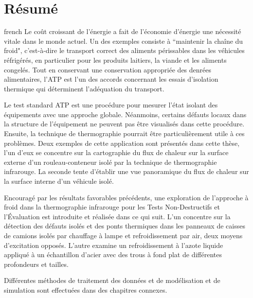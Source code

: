 \chapter*{Résumé}                      %

\begin{otherlanguage*}{french}
  Le coût croissant de l'énergie a fait de l'économie d'énergie une nécessité vitale dans le monde actuel. Un des exemples consiste à ``maintenir la chaîne du froid", c'est-à-dire le transport correct des aliments périssables dans les véhicules réfrigérés, en particulier pour les produits laitiers, la viande et les aliments congelés. Tout en conservant une conservation appropriée des denrées alimentaires, l'ATP est l'un des accords concernant les essais d'isolation thermique qui déterminent l'adéquation du transport.
  
  Le test standard ATP est une procédure pour mesurer l'état isolant des équipements avec une approche globale. Néanmoins, certains défauts locaux dans la structure de l'équipement ne peuvent pas être visualisés dans cette procédure. Ensuite, la technique de thermographie pourrait être particulièrement utile à ces problèmes. Deux exemples de cette application sont présentés dans cette thèse, l'un d'eux se concentre sur la cartographie du flux de chaleur sur la surface externe d'un rouleau-conteneur isolé par la technique de thermographie infrarouge. La seconde tente d'établir une vue panoramique du flux de chaleur sur la surface interne d'un véhicule isolé.
  
  Encouragé par les résultats favorables précédents, une exploration de l'approche à froid dans la thermographie infrarouge pour les Tests Non-Destructifs et l'Évaluation est introduite et réalisée dans ce qui suit. L'un concentre sur la détection des défauts isolés et des ponts thermiques dans les panneaux de caisses de camions isolés par chauffage à lampe et refroidissement par air, deux moyens d'excitation opposés. L'autre examine un refroidissement à l'azote liquide appliqué à un échantillon d'acier avec des trous à fond plat de différentes profondeurs et tailles.
  
  Différentes méthodes de traitement des données et de modélisation et de simulation sont effectuées dans des chapitres connexes.
\end{otherlanguage*}
